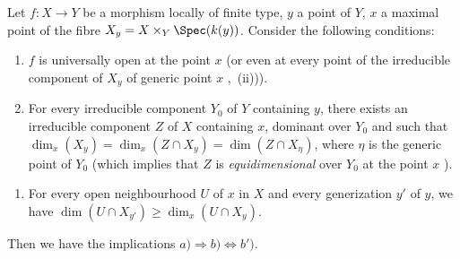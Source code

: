 \begin{proposition}[14.3.13]
\label{IV.14.3.13}
Let $f:X\to Y$ be a morphism locally of finite type, $y$ a point of $Y$, $x$ a maximal point of the fibre $X_y=X\times_Y\Spec(k(y))$.
Consider the following conditions:
\begin{enumerate}[label=\emph{\alph*)}]
  \item $f$ is universally open at the point $x$ (or even at every point of the irreducible component of $X_y$ of generic point $x$ ,~(ii))).
  \item For every irreducible component $Y_0$ of $Y$ containing $y$, there exists an irreducible component $Z$ of $X$ containing $x$, dominant over $Y_0$ and such that $\dim_x(X_y)=\dim_x(Z\cap X_y)=\dim(Z\cap X_\eta)$, where $\eta$ is the generic point of $Y_0$ (which implies that $Z$ is \emph{equidimensional} over $Y_0$ at the point $x$ ).
\end{enumerate}


\begin{enumerate}[label=\emph{\alph*$'$)}]
  \item[b$'$)] For every open neighbourhood $U$ of $x$ in $X$ and every generization $y'$ of $y$, we have $\dim(U\cap X_{y'})\geq\dim_x(U\cap X_y)$.
\end{enumerate}

Then we have the implications $a)\Rightarrow b)\Leftrightarrow b')$.
\end{proposition}

